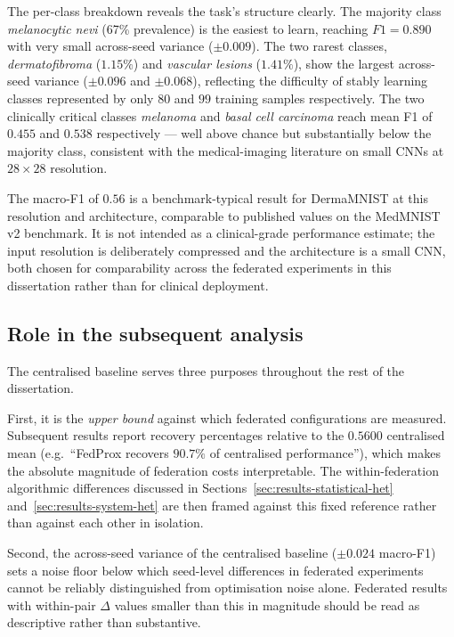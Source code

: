 The per-class breakdown reveals the task's structure clearly. The
majority class \emph{melanocytic nevi} (67\% prevalence) is the
easiest to learn, reaching $F1 = 0.890$ with very small across-seed
variance ($\pm 0.009$). The two rarest classes,
\emph{dermatofibroma} ($1.15\%$) and \emph{vascular lesions}
($1.41\%$), show the largest across-seed variance ($\pm 0.096$ and
$\pm 0.068$), reflecting the difficulty of stably learning classes
represented by only $80$ and $99$ training samples respectively.
The two clinically critical classes \emph{melanoma} and
\emph{basal cell carcinoma} reach mean F1 of $0.455$ and $0.538$
respectively --- well above chance but substantially below the
majority class, consistent with the medical-imaging literature on
small CNNs at $28\times28$ resolution.

The macro-F1 of $0.56$ is a benchmark-typical result for
DermaMNIST at this resolution and architecture, comparable to
published values on the MedMNIST v2 benchmark. It is not intended
as a clinical-grade performance estimate; the input resolution is
deliberately compressed and the architecture is a small CNN, both
chosen for comparability across the federated experiments in this
dissertation rather than for clinical deployment.

\subsection{Role in the subsequent analysis}
\label{sec:centralised-role}

The centralised baseline serves three purposes throughout the rest
of the dissertation.

First, it is the \emph{upper bound} against which federated
configurations are measured. Subsequent results report recovery
percentages relative to the $0.5600$ centralised mean
(e.g.\ ``FedProx recovers $90.7\%$ of centralised performance''),
which makes the absolute magnitude of federation costs
interpretable. The within-federation algorithmic differences
discussed in Sections~\ref{sec:results-statistical-het}
and~\ref{sec:results-system-het} are then framed against this
fixed reference rather than against each other in isolation.

Second, the across-seed variance of the centralised baseline
($\pm 0.024$ macro-F1) sets a noise floor below which seed-level
differences in federated experiments cannot be reliably
distinguished from optimisation noise alone. Federated results
with within-pair $\Delta$ values smaller than this in magnitude
should be read as descriptive rather than substantive.

